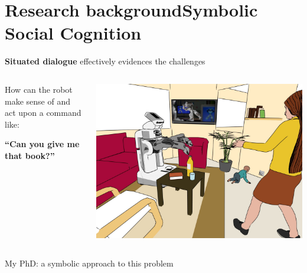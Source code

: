 \documentclass[compress]{beamer}
\begin{document}

\section{Research background\newline Symbolic Social Cognition}




\begin{frame}[plain]

    \centering
    {\bf Situated dialogue} effectively evidences the challenges

    \begin{columns}
        \begin{column}{0.5\linewidth}
            How can the robot make sense of and act upon a command like:
            \vspace{2em}

            \bf
            ``Can you give me that book?''
        \end{column}
        \begin{column}{0.5\linewidth}
            \begin{center}
                \includegraphics[width=\linewidth]{pr2-baby-3}
            \end{center}
        \end{column}
    \end{columns}

    \pause

    \vspace{2em}
    My PhD: a symbolic approach to this problem
\end{frame}
\end{document}
